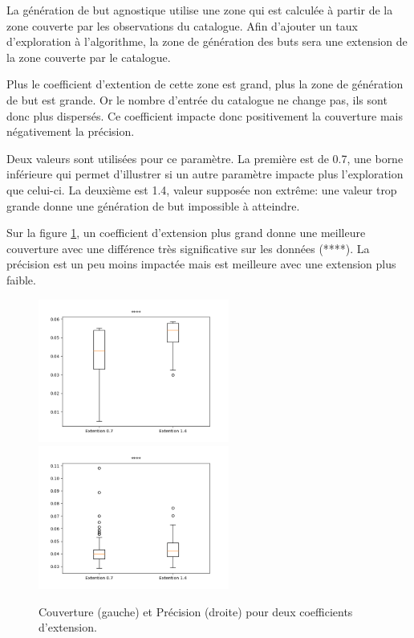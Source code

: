 \documentclass[11pt,french]{report}
\begin{document}
La génération de but agnostique utilise une zone qui est calculée à partir de la zone couverte par les observations du catalogue.
Afin d'ajouter un taux d'exploration à l'algorithme, la zone de génération des buts sera une extension de la zone couverte par le catalogue.

Plus le coefficient d'extention de cette zone est grand, plus la zone de génération de but est grande.
Or le nombre d'entrée du catalogue ne change pas, ils sont donc plus dispersés.
Ce coefficient impacte donc positivement la couverture mais négativement la précision.

Deux valeurs sont utilisées pour ce paramètre.
La première est de 0.7, une borne inférieure qui permet d'illustrer si un autre paramètre impacte plus l'exploration que celui-ci.
La deuxième est 1.4, valeur supposée non extrême: une valeur trop grande donne une génération de but impossible à atteindre.

Sur la figure \ref{fig:effet_exp}, un coefficient d'extension plus grand donne une meilleure couverture avec une différence très significative sur les données (****).
La précision est un peu moins impactée mais est meilleure avec une extension plus faible.

\begin{figure}[h]
    \centering
    \includegraphics[width=178pt]{Agn_.7-1.4exp_couver.png} \includegraphics[width=178pt]{Agn_.7-1.4exp_moy_ik.png}
    \caption{Couverture (gauche) et Précision (droite) pour deux coefficients d'extension.}
    \label{fig:effet_exp}
\end{figure}
\end{document}
